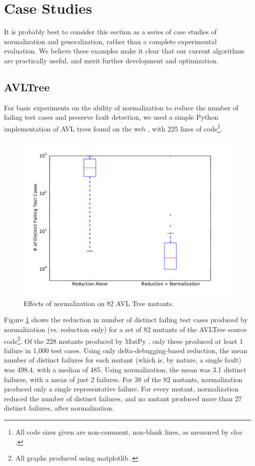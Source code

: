 \section {Case Studies}

It is probably best to consider this section as a series of case
studies of normalization and generalization, rather than a complete
experimental evaluation.  We believe these examples make it clear that
our current algorithms are practically useful, and merit further
development and optimization.

\subsection{AVLTree}

For basic experiments on the ability of normalization to reduce the
number of failing test cases and preserve fault detection, we used a
simple Python implementation of AVL trees found on the web
\cite{avltree}, with 225 lines of code\footnote{All code sizes given
  are non-comment, non-blank lines, as measured by cloc \cite{cloc}.}.

\begin{figure}
\includegraphics[width=\columnwidth]{length}
\caption{Effects of normalization on 82 AVL Tree mutants.}
\label{normeffect}
\end{figure}

Figure \ref{normeffect} shows the reduction in number of distinct
failing test cases produced by normalization (vs. reduction only) for
a set of 82 mutants of the AVLTree source code\footnote{All graphs
  produced using matplotlib \cite{Hunter:2007}.}.  Of the 228 mutants
produced by MutPy \cite{mutpy}, only these produced at least 1 failure
in 1,000 test cases.  Using only delta-debugging-based reduction, the
mean number of distinct failures for each mutant (which is, by nature,
a single fault) was 498.4, with a median of 485.  Using normalization,
the mean was 3.1 distinct failures, with a mean of just 2 failures.
For 38 of the 82 mutants, normalization produced only a single
representative failure.  For every mutant, normalization reduced the
number of distinct failures, and no mutant produced more than 27
distinct failures, after normalization.

